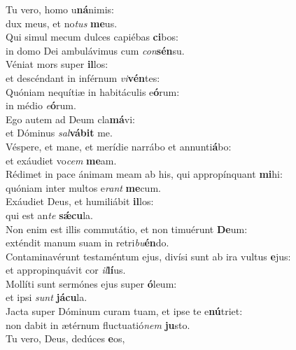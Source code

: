 \evenverse Tu vero, homo u\textbf{ná}nimis:~\*\\
\evenverse dux meus, et no\textit{tus} \textbf{me}us.\\
\oddverse Qui simul mecum dulces capiébas \textbf{ci}bos:~\*\\
\oddverse in domo Dei ambulávimus cum \textit{con}\textbf{sén}su.\\
\evenverse Véniat mors super \textbf{il}los:~\*\\
\evenverse et descéndant in inférnum \textit{vi}\textbf{vén}tes:\\
\oddverse Quóniam nequítiæ in habitáculis e\textbf{ó}rum:~\*\\
\oddverse in médio \textit{e}\textbf{ó}rum.\\
\evenverse Ego autem ad Deum cla\textbf{má}vi:~\*\\
\evenverse et Dóminus \textit{sal}\textbf{vá}\textbf{bit} me.\\
\oddverse Véspere, et mane, et merídie narrábo et annunti\textbf{á}bo:~\*\\
\oddverse et exáudiet vo\textit{cem} \textbf{me}am.\\
\evenverse Rédimet in pace ánimam meam ab his, qui appropínquant \textbf{mi}hi:~\*\\
\evenverse quóniam inter multos e\textit{rant} \textbf{me}cum.\\
\oddverse Exáudiet Deus, et humiliábit \textbf{il}los:~\*\\
\oddverse qui est an\textit{te} \textbf{sǽ}\textbf{cu}la.\\
\evenverse Non enim est illis commutátio, et non timuérunt \textbf{De}um:~\*\\
\evenverse exténdit manum suam in retri\textit{bu}\textbf{én}do.\\
\oddverse Contaminavérunt testaméntum ejus, divísi sunt ab ira vultus \textbf{e}jus:~\*\\
\oddverse et appropinquávit cor \textit{il}\textbf{lí}us.\\
\evenverse Mollíti sunt sermónes ejus super \textbf{ó}leum:~\*\\
\evenverse et ipsi \textit{sunt} \textbf{já}\textbf{cu}la.\\
\oddverse Jacta super Dóminum curam tuam, et ipse te e\textbf{nú}triet:~\*\\
\oddverse non dabit in ætérnum fluctuatió\textit{nem} \textbf{ju}sto.\\
\evenverse Tu vero, Deus, dedúces \textbf{e}os,~\*\\
